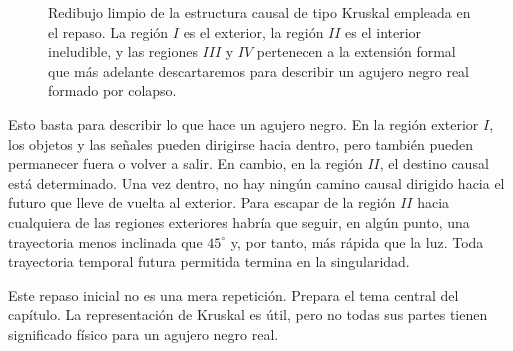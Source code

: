 \begin{figure}[htbp]
\centering
{}
\caption{Redibujo limpio de la estructura causal de tipo Kruskal empleada en el repaso. La región \(I\) es el exterior, la región \(II\) es el interior ineludible, y las regiones \(III\) y \(IV\) pertenecen a la extensión formal que más adelante descartaremos para describir un agujero negro real formado por colapso.}
\end{figure}

Esto basta para describir lo que hace un agujero negro. En la región exterior \(I\), los objetos y las señales pueden dirigirse hacia dentro, pero también pueden permanecer fuera o volver a salir. En cambio, en la región \(II\), el destino causal está determinado. Una vez dentro, no hay ningún camino causal dirigido hacia el futuro que lleve de vuelta al exterior. Para escapar de la región \(II\) hacia cualquiera de las regiones exteriores habría que seguir, en algún punto, una trayectoria menos inclinada que \(45^\circ\) y, por tanto, más rápida que la luz. Toda trayectoria temporal futura permitida termina en la singularidad.

Este repaso inicial no es una mera repetición. Prepara el tema central del capítulo. La representación de Kruskal es útil, pero no todas sus partes tienen significado físico para un agujero negro real.

\begin{classroomqa}
\end{classroomqa}

